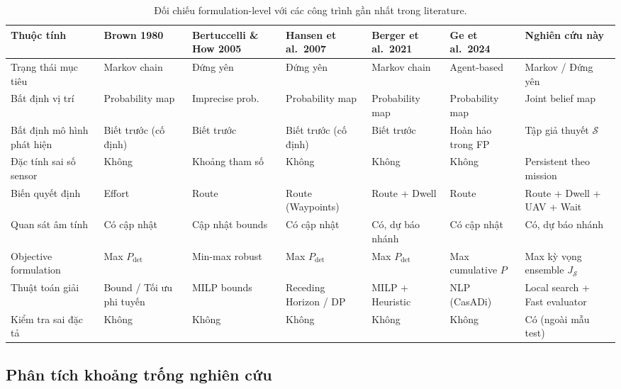 \documentclass[12pt,a4paper]{article}
\begin{document}
\begin{table}[H]
\centering
\caption{Đối chiếu formulation-level với các công trình gần nhất trong literature.}
\label{tab:relwork}
\scriptsize
\begin{tabular}{@{}p{2.6cm}p{1.7cm}p{2.1cm}p{1.9cm}p{2.1cm}p{1.9cm}p{2.2cm}@{}}
\toprule
\textbf{Thuộc tính} &
\textbf{Brown 1980} \cite{brown1980} &
\textbf{Bertuccelli \& How 2005} \cite{bertuccelli2005} &
\textbf{Hansen et al.\ 2007} \cite{hansen2007} &
\textbf{Berger et al.\ 2021} \cite{berger2021} &
\textbf{Ge et al.\ 2024} \cite{ge2024} &
\textbf{Nghiên cứu này} \\
\midrule
Trạng thái mục tiêu &
Markov chain &
Đứng yên &
Đứng yên &
Markov chain &
Agent-based &
Markov / Đứng yên \\
Bất định vị trí &
Probability map &
Imprecise prob. &
Probability map &
Probability map &
Probability map &
Joint belief map \\
Bất định mô hình phát hiện &
Biết trước (cố định) &
Biết trước &
Biết trước (cố định) &
Biết trước &
Hoàn hảo trong FP &
Tập giả thuyết $\mathcal{S}$ \\
Đặc tính sai số sensor &
Không &
Khoảng tham số &
Không &
Không &
Không &
Persistent theo mission \\
Biến quyết định &
Effort &
Route &
Route (Waypoints) &
Route + Dwell &
Route &
Route + Dwell + UAV + Wait \\
Quan sát âm tính &
Có cập nhật &
Cập nhật bounds &
Có cập nhật &
Có, dự báo nhánh &
Có cập nhật &
Có, dự báo nhánh \\
Objective formulation &
Max $P_{\mathrm{det}}$ &
Min-max robust &
Max $P_{\mathrm{det}}$ &
Max $P_{\mathrm{det}}$ &
Max cumulative $P$ &
Max kỳ vọng ensemble $J_{\mathcal{S}}$ \\
Thuật toán giải &
Bound / Tối ưu phi tuyến &
MILP bounds &
Receding Horizon / DP &
MILP + Heuristic &
NLP (CasADi) &
Local search + Fast evaluator \\
Kiểm tra sai đặc tả &
Không &
Không &
Không &
Không &
Không &
Có (ngoài mẫu test) \\
\bottomrule
\end{tabular}
\end{table}

\subsection{Phân tích khoảng trống nghiên cứu}
\end{document}
